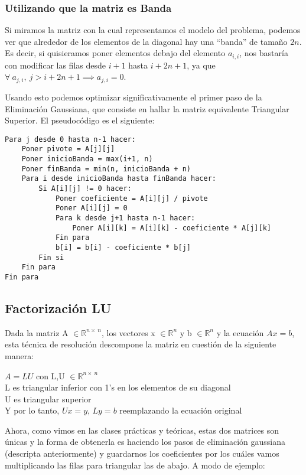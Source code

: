 \subsubsection{Utilizando que la matriz es Banda}

Si miramos la matriz con la cual representamos el modelo del problema, podemos ver que alrededor de los elementos de la diagonal hay una ``banda'' de tamaño $2n$.
Es decir, si quisieramos poner elementos debajo del elemento $a_{i,i}$, nos bastaría con modificar las filas desde $i+1$ hasta $i+2n+1$, ya que $\forall\ a_{j,i},\ j> i+2n+1 \implies a_{j,i} = 0$.

Usando esto podemos optimizar significativamente el primer paso de la Eliminación Gaussiana, que consiste en hallar la matriz equivalente Triangular Superior. El pseudocódigo es el siguiente:

\begin{lstlisting}
Para j desde 0 hasta n-1 hacer:
    Poner pivote = A[j][j]
    Poner inicioBanda = max(i+1, n)
    Poner finBanda = min(n, inicioBanda + n)
    Para i desde inicioBanda hasta finBanda hacer:
        Si A[i][j] != 0 hacer:
            Poner coeficiente = A[i][j] / pivote
            Poner A[i][j] = 0
            Para k desde j+1 hasta n-1 hacer:
                Poner A[i][k] = A[i][k] - coeficiente * A[j][k]
            Fin para
            b[i] = b[i] - coeficiente * b[j]
        Fin si
    Fin para
Fin para
\end{lstlisting}

\subsection{Factorización LU}

Dada la matriz A $\in \mathbb{R}^{n \times\ n}$, los vectores x $\in \mathbb{R}^{n}$ y b $\in \mathbb{R}^{n}$ y la ecuación $Ax = b$, esta técnica de resolución descompone la matriz en cuestión de la siguiente manera:

\begin{center}
    $A = LU$ con L,U $\in \mathbb{R}^{n \times\ n}$\\
    L es triangular inferior con 1's en los elementos de su diagonal\\
    U es triangular superior\\
    Y por lo tanto, $Ux = y$, $Ly = b$ reemplazando la ecuación original
\end{center}

Ahora, como vimos en las clases prácticas y teóricas, estas dos matrices son únicas y la forma de obtenerla es haciendo los pasos de eliminación gaussiana (descripta anteriormente) y guardarnos los coeficientes por los cuáles vamos multiplicando las filas para triangular las de abajo. A modo de ejemplo:


